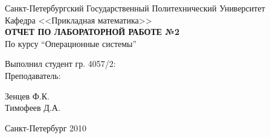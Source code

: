 \begin{titlepage}

\begin{center}

\large Санкт-Петербургский Государственный Политехнический Университет \\
Кафедра <<Прикладная математика>> \\ [8.0cm]
\textbf{\textsc{ОТЧЕТ ПО ЛАБОРАТОРНОЙ РАБОТЕ №2}}\\[1.0cm]
По курсу ``Операционные системы''\\[3.0cm]

\begin{minipage}{0.4\textwidth}
\begin{flushleft} \large
  Выполнил студент гр. 4057/2: \\ [1.0cm]
  Преподаватель:
\end{flushleft}
\end{minipage}
\begin{minipage}{0.4\textwidth}
\begin{flushright} \large
Зенцев Ф.К. \\ [1.0cm]
Тимофеев Д.А.
\end{flushright}
\end{minipage}

\vfill

\large Санкт-Петербург 2010



\end{center}
\end{titlepage}
